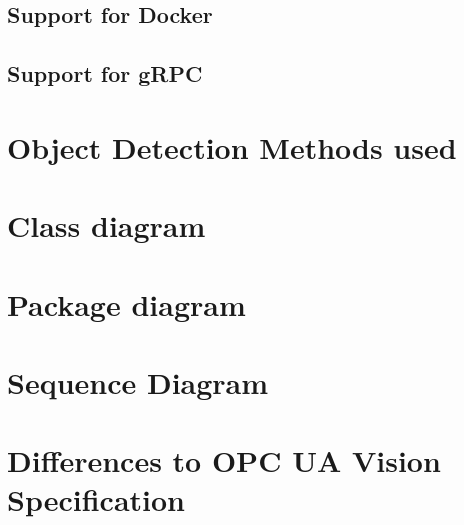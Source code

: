 \subsection{Support for Docker}

\subsection{Support for gRPC}

\section{Object Detection Methods used}
\section{Class diagram}
\section{Package diagram}
\section{Sequence Diagram}
\section{Differences to OPC UA Vision Specification}